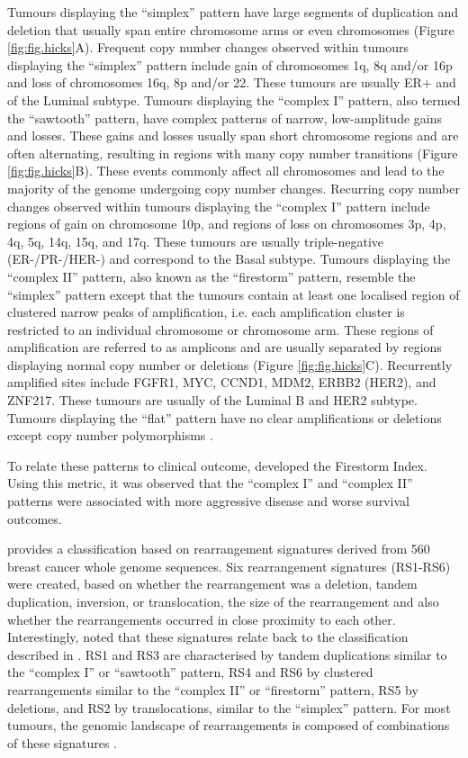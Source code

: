 Tumours displaying the “simplex” pattern have large segments of duplication and deletion that usually span entire chromosome arms or even chromosomes (Figure \ref{fig:fig.hicks}A). Frequent copy number changes observed within tumours displaying the “simplex” pattern include gain of chromosomes 1q, 8q and/or 16p and loss of chromosomes 16q, 8p and/or 22. These tumours are usually ER+ and of the Luminal subtype. Tumours displaying the “complex I” pattern, also termed the “sawtooth” pattern, have complex patterns of narrow, low-amplitude gains and losses. These gains and losses usually span short chromosome regions and are often alternating, resulting in regions with many copy number transitions (Figure \ref{fig:fig.hicks}B). These events commonly affect all chromosomes and lead to the majority of the genome undergoing copy number changes. Recurring copy number changes observed within tumours displaying the “complex I” pattern include regions of gain on chromosome 10p, and regions of loss on chromosomes 3p, 4p, 4q, 5q, 14q, 15q, and 17q. These tumours are usually triple-negative (ER-/PR-/HER-) and correspond to the Basal subtype. Tumours displaying the “complex II” pattern, also known as the “firestorm” pattern, resemble the “simplex” pattern except that the tumours contain at least one localised region of clustered narrow peaks of amplification, i.e. each amplification cluster is restricted to an individual chromosome or chromosome arm. These regions of amplification are referred to as amplicons and are usually separated by regions displaying normal copy number or deletions (Figure \ref{fig:fig.hicks}C). Recurrently amplified sites include FGFR1, MYC, CCND1, MDM2, ERBB2 (HER2), and ZNF217. These tumours are usually of the Luminal B and HER2 subtype. Tumours displaying the “flat” pattern have no clear amplifications or deletions except copy number polymorphisms \citep{pmid17142309, pmid28733194}. 

To relate these patterns to clinical outcome, \cite{pmid17142309} developed the Firestorm Index. Using this metric, it was observed that the “complex I” and “complex II” patterns were associated with more aggressive disease and worse survival outcomes. 

\cite{pmid27136393} provides a classification based on rearrangement signatures derived from 560 breast cancer whole genome sequences. Six rearrangement signatures (RS1-RS6) were created, based on whether the rearrangement was a deletion, tandem duplication, inversion, or translocation, the size of the rearrangement and also whether the rearrangements occurred in close proximity to each other. Interestingly, \cite{pmid28733194} noted that these signatures relate back to the classification described in \cite{pmid17142309}. RS1 and RS3 are characterised by tandem duplications similar to the “complex I” or “sawtooth” pattern, RS4 and RS6 by clustered rearrangements similar to the “complex II” or “firestorm” pattern, RS5 by deletions, and RS2 by translocations, similar to the “simplex” pattern. For most tumours, the genomic landscape of rearrangements is composed of combinations of these signatures \citep{pmid27136393, pmid28733194}.

